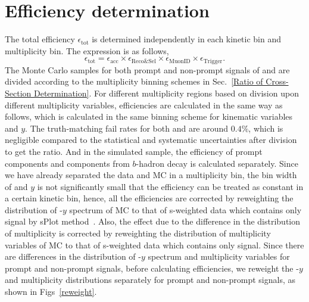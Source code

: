 \section{Efficiency determination}\label{sec:efficiency}
\def\effTot{\ensuremath{\epsilon_{\mathrm{tot}}}\xspace}
\def\effAcc{\ensuremath{\epsilon_{\mathrm{acc}}}\xspace}
\def\effReco{\ensuremath{\epsilon_{\mathrm{Reco\&Sel}}}\xspace}
\def\effID{\ensuremath{\epsilon_{\mathrm{MuonID}}}\xspace}
\def\effTrigger{\ensuremath{\epsilon_{\mathrm{Trigger}}}\xspace}
The total efficiency \effTot is determined independently in each kinetic bin and multiplicity 
bin. The expression is as follows,
\begin{equation}
    \effTot = \effAcc \times \effReco \times \effID \times \effTrigger.
\end{equation}
The Monte Carlo samples for both prompt and non-prompt signals of \jpsi and \psitwos are divided according to the multiplicity binning schemes in Sec.~\ref{Ratio of Cross-Section Determination}. 
For different multiplicity regions based on division upon different multiplicity variables, efficiencies are calculated in the same way as follows, which is calculated in the same binning scheme for kinematic variables \pt and $y$. 
The truth-matching fail rates for both \jpsi and \psitwos are around $0.4\%$, which is negligible compared to the statistical 
and systematic uncertainties after division to get the ratio. And in the simulated sample, the efficiency of prompt components 
and components from $b$-hadron decay is calculated separately. Since we have already separated 
the data and MC in a multiplicity bin, the bin width of \pt and $y$ is not significantly small 
that the efficiency can be treated as constant in a certain kinetic bin, hence, all the efficiencies 
are corrected by reweighting the distribution of \pt-$y$ spectrum of MC to that of s-weighted data 
which contains only signal by sPlot method~\cite{Pivk:2004ty}. Also, the effect due to the difference in the distribution of 
multiplicity is corrected by reweighting the distribution of multiplicity variables of MC to that of 
s-weighted data which contains only signal. Since there are differences in the distribution of \pt-$y$ spectrum and multiplicity variables for prompt and non-prompt signals, 
before calculating efficiencies, we reweight the \pt-$y$ and multiplicity distributions separately for prompt and non-prompt signals, as shown in Figs~\ref{reweight}.
